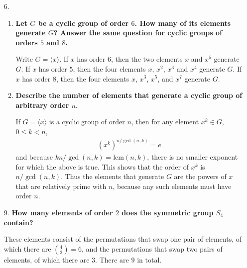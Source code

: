 \documentclass[a4paper,12pt]{article}
\begin{document}
\begin{enumerate}
    \item[6.]
        \begin{enumerate}
            \item
                \boldmath
                \textbf{Let $G$ be a cyclic group of order $6$. How many of its elements generate $G$? Answer the same question for cyclic groups of orders $5$ and $8$.} \par
                \unboldmath
                Write $G = \langle x \rangle$. If $x$ has order $6$, then the two elements $x$ and $x^5$ generate $G$. If $x$ has order $5$, then the four elements $x$, $x^2$, $x^3$ and $x^4$ generate $G$. If $x$ has order $8$, then the four elements $x$, $x^3$, $x^5$, and $x^7$ generate $G$.

            \item
                \boldmath
                \textbf{Describe the number of elements that generate a cyclic group of arbitrary order $n$.} \par
                \unboldmath
                If $G = \langle x \rangle$ is a cyclic group of order $n$, then for any element $x^k \in G$, $0 \leq k < n$,
                \begin{align*}
                    \left( x^k \right)^{n / \gcd(n, k)} = e
                \end{align*}
                and because $kn / \gcd(n, k) = \text{lcm}(n, k)$, there is no smaller exponent for which the above is true. This shows that the order of $x^k$ is $n / \gcd(n, k)$. Thus the elements that generate $G$ are the powers of $x$ that are relatively prime with $n$, because any such elements must have order $n$.
        \end{enumerate}

    \item[9.]
        \boldmath
        \textbf{How many elements of order $2$ does the symmetric group $S_4$ contain?} \par
        \unboldmath
        These elements consist of the permutations that swap one pair of elements, of which there are $\binom{4}{2} = 6$, and the permutations that swap two pairs of elements, of which there are $3$. There are $9$ in total.


\end{enumerate}
\end{document}
